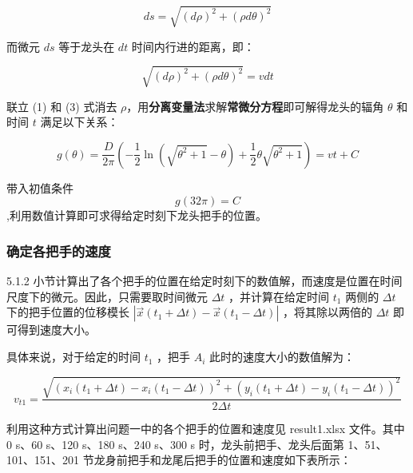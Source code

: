 \documentclass[a4paper]{article}
\begin{document}
		$$ ds = \sqrt{(d\rho)^2 + (\rho d\theta) ^ 2}$$

		而微元 $ds$ 等于龙头在 $dt$ 时间内行进的距离，即：

		\begin{equation}
			\sqrt{(d\rho)^2 + (\rho d\theta) ^ 2} = vdt
		\end{equation}

		联立 (1) 和 (3) 式消去 $\rho$，用\textbf{分离变量法}求解\textbf{常微分方程}即可解得龙头的辐角 $\theta$ 和时间 $t$ 满足以下关系：

		\begin{equation}
			g(\theta) = \frac{D}{2\pi}(-\frac{1}{2}\ln(\sqrt{\theta^2+1}-\theta)+\frac{1}{2}\theta\sqrt{\theta^2+1})=vt+C
		\end{equation}


		带入初值条件$$g(32  \pi) = C$$,利用数值计算即可求得给定时刻下龙头把手的位置。

	\subsubsection{确定各把手的速度}

		5.1.2 小节计算出了各个把手的位置在给定时刻下的数值解，而速度是位置在时间尺度下的微元。因此，只需要取时间微元 $\Delta t$ ，并计算在给定时间 $t_1$ 两侧的 $\Delta t$ 下的把手位置的位移模长 $|\vec{x}(t_1+\Delta t) - \vec{x}(t_1 - \Delta t)|$ ，将其除以两倍的 $\Delta t$ 即可得到速度大小。



		具体来说，对于给定的时间 $t_1$ ，把手 $A_i$ 此时的速度大小的数值解为：

		\begin{equation}
			v_{t1} = \frac{\sqrt{(x_i(t_1 + \Delta t) - x_i(t_1 - \Delta t))^2 + (y_i(t_1 + \Delta t) - y_i(t_1 - \Delta t))^2}}{2\Delta t}
		\end{equation}


		利用这种方式计算出问题一中的各个把手的位置和速度见 result1.xlsx 文件。其中 0 s、60 s、120 s、180 s、240 s、300 s 时，龙头前把手、龙头后面第 1、51、101、151、201 节龙身前把手和龙尾后把手的位置和速度如下表所示：
\end{document}
